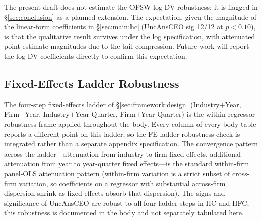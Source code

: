 The present draft does not estimate the OPSW log-DV robustness; it is flagged in \S\ref{sec:conclusion} as a planned extension. The expectation, given the magnitude of the linear-form coefficients in \S\ref{sec:main:hc} (UncAnsCEO sig 12/12 at $p<0.10$), is that the qualitative result survives under the log specification, with attenuated point-estimate magnitudes due to the tail-compression. Future work will report the log-DV coefficients directly to confirm this expectation.

\subsection{Fixed-Effects Ladder Robustness}
\label{app:robustness:fe}

The four-step fixed-effects ladder of \S\ref{sec:framework:design} (Industry$+$Year, Firm$+$Year, Industry$+$Year-Quarter, Firm$+$Year-Quarter) is the within-regressor robustness frame applied throughout the body. Every column of every body table reports a different point on this ladder, so the FE-ladder robustness check is integrated rather than a separate appendix specification. The convergence pattern across the ladder---attenuation from industry to firm fixed effects, additional attenuation from year to year-quarter fixed effects---is the standard within-firm panel-OLS attenuation pattern (within-firm variation is a strict subset of cross-firm variation, so coefficients on a regressor with substantial across-firm dispersion shrink as fixed effects absorb that dispersion). The signs and significance of UncAnsCEO are robust to all four ladder steps in HC and HFC; this robustness is documented in the body and not separately tabulated here.
